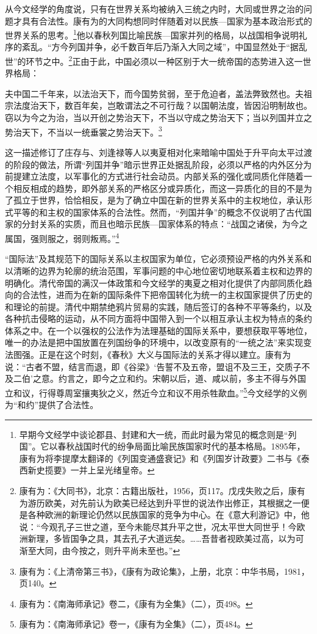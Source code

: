 \documentclass[a4paper, 12pt, openright]{ctexbook}
\renewenvironment{quote}
  {\list{}{\rightmargin2\ccwd \leftmargin2\ccwd \itemindent=2\ccwd \listparindent=2\ccwd}%
   \item\relax\small\kaishu\color{black}}
  {\endlist}
\begin{document}
从今文经学的角度说，只有在世界关系均被纳入三统之内时，大同或世界之治的问题才具有合法性。康有为的大同构想同时伴随着对以民族—国家为基本政治形式的世界关系的思考。\footnote{早期今文经学中谈论郡县、封建和大一统，而此时最为常见的概念则是“列国”。它以春秋战国时代的纷争局面比喻民族国家时代的基本格局。1895年，康有为将李提摩太翻译的《列国变通盛衰记》和《列国岁计政要》二书与《泰西新史揽要》一并上呈光绪皇帝。}他以春秋列国比喻民族—国家并列的格局，以战国相争说明礼序的紊乱。“方今列国并争，必千数百年后乃渐入大同之域”，中国显然处于“据乱世”的环节之中。\footnote{康有为：《大同书》，北京：古籍出版社，1956，页117。戊戌失败之后，康有为游历欧美，对先前认为欧美已经达到升平世的说法作出修正，其根据之一便是各种欧洲的新理论仍然以民族国家的竞争为中心。在《意大利游记》中，他说：“今观孔子三世之道，至今未能尽其升平之世，况太平世大同世乎！今欧洲新理，多皆国争之具，其去孔子大道远矣。……吾昔者视欧美过高，以为可渐至大同，由今按之，则升平尚未至也。”}正由于此，中国必须以一种区别于大一统帝国的态势进入这一世界格局：

\begin{quote}
夫中国二千年来，以法治天下，而今国势贫弱，至于危迫者，盖法弊致然也。夫祖宗法度治天下，数百年矣，岂敢谓法之不可行哉？以国朝法度，皆因沿明制故也。窃以为今之为治，当以开创之势治天下，不当以守成之势治天下；当以列国并立之势治天下，不当以一统垂裳之势治天下。\footnote{康有为：《上清帝第三书》，《康有为政论集》，上册，北京：中华书局，1981，页140。}
\end{quote}

这一描述修订了庄存与、刘逢禄等人以夷夏相对化来暗喻中国处于升平向太平过渡的阶段的做法，所谓“列国并争”暗示世界正处据乱阶段，必须以严格的内外区分为前提建立法度，以军事化的方式进行社会动员。内部关系的强化或同质化伴随着一个相反相成的趋势，即外部关系的严格区分或异质化，而这一异质化的目的不是为了孤立于世界，恰恰相反，是为了确立中国在新的世界关系中的主权地位，承认形式平等的和主权的国家体系的合法性。然而，“列国并争”的概念不仅说明了古代国家的分封关系的实质，而且也暗示民族—国家体系的特点：“战国之诸侯，为今之属国，强则服之，弱则叛焉。”\footnote{康有为：《南海师承记》卷二，《康有为全集》（二），页498。}

“国际法”及其规范下的国际关系以主权国家为单位，它必须预设严格的内外关系和以清晰的边界为轮廓的统治范围，军事问题的中心地位密切地联系着主权和边界的明确化。清代帝国的满汉一体政策和今文经学的夷夏之相对化提供了内部同质化趋向的合法性，进而为在新的国际条件下把帝国转化为统一的主权国家提供了历史的和理论的前提。清代中期禁绝鸦片贸易的实践，随后签订的各种不平等条约，以及各种抗击侵略的运动，从不同方面将中国带入到一个以相互承认主权为特点的条约体系之中。在一个以强权的公法作为法理基础的国际关系中，要想获取平等地位，唯一的办法是把中国放置在列国纷争的环境中，以改变原有的“一统之法”来实现变法图强。正是在这个时刻，《春秋》大义与国际法的关系才得以建立。康有为说：“古者不盟，结言而退，即《谷梁》‘告誓不及五帝，盟诅不及三王，交质子不及二伯’之意。约言之，即今之立和约。宋朝以后，道、咸以前，多主不得与外国立和议，行得尊周室攘夷狄之义，然近今立和议不用杀牲歃血。”\footnote{康有为：《南海师承记》卷一，《康有为全集》（二），页484。}今文经学的义例为“和约”提供了合法性。
\end{document}
